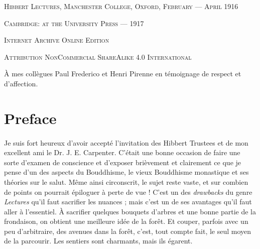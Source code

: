\documentclass[a4paper, 11pt, oneside, english]{article}
\begin{document}
\begin{titlepage}
	\vspace{1\baselineskip}

        {\footnotesize\scshape Hibbert Lectures, Manchester College, Oxford, February --- April 1916}
	
	{\footnotesize\scshape{Cambridge: at the University Press --- 1917}}
	
	\vspace{0.25\baselineskip} %

        {\scshape\small Internet Archive Online Edition}%
    
	{\scshape\footnotesize Attribution NonCommercial ShareAlike 4.0 International } %
\end{titlepage}
\setlength{\parskip}{1mm plus1mm minus1mm}
\clearpage
\tableofcontents
\clearpage
\vspace*{\fill}
\begin{center}\footnotesize
À mes collègues Paul Frederico et Henri Pirenne en témoignage de respect et d'affection.
\end{center}
\vspace*{\fill} 
\clearpage
\section*{Preface}
\paragraph{}
Je suis fort heureux d'avoir accepté l'invitation des Hibbert Trustees et de mon excellent ami le Dr. J. E. Carpenter. C'était une bonne occasion de faire une sorte d'examen de conscience et d'exposer brièvement et clairement ce que je pense d'un des aspects du Bouddhisme, le vieux Bouddhisme monastique et ses théories sur le salut. Même ainsi circonscrit, le sujet reste vaste, et sur combien de points on pourrait épiloguer à perte de vue ! C'est un des \emph{drawbacks} du genre \emph{Lectures} qu'il faut sacrifier les nuances ; mais c'est un de ses avantages qu'il faut aller à l'essentiel. À sacrifier quelques bouquets d'arbres et une bonne partie de la frondaison, on obtient une meilleure idée de la forêt. Et couper, parfois avec un peu d'arbitraire, des avenues dans la forêt, c'est, tout compte fait, le seul moyen de la parcourir. Les sentiers sont charmants, mais ils égarent.
\end{document}
